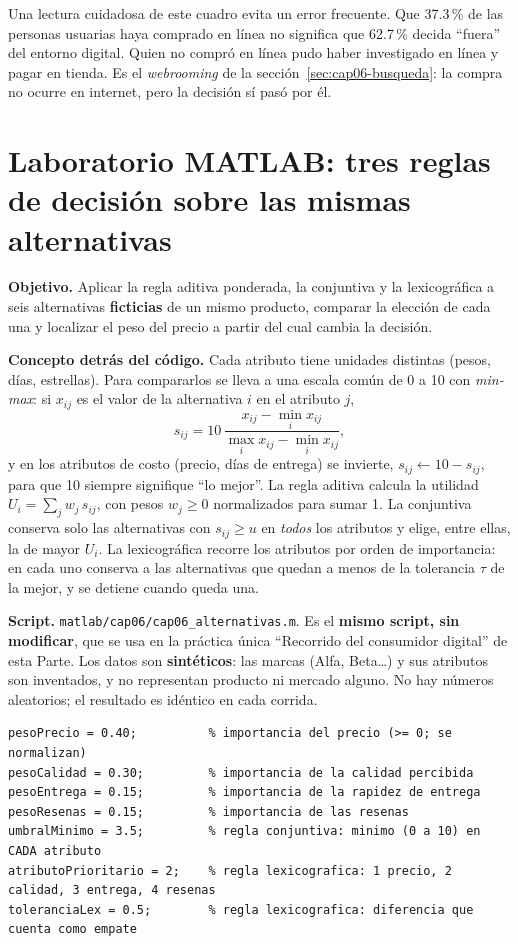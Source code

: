 Una lectura cuidadosa de este cuadro evita un error frecuente. Que 37.3\,\% de
las personas usuarias haya comprado en línea no significa que 62.7\,\% decida
\enquote{fuera} del entorno digital. Quien no compró en línea pudo haber
investigado en línea y pagar en tienda. Es el \textit{webrooming} de la
sección~\ref{sec:cap06-busqueda}: la compra no ocurre en internet, pero la decisión sí pasó por él.

\section{Laboratorio MATLAB: tres reglas de decisión sobre las mismas alternativas}
\label{sec:cap06-lab}

\begin{cajaLaboratorio}
\textbf{Objetivo.} Aplicar la regla aditiva ponderada, la conjuntiva y la
lexicográfica a seis alternativas \textbf{ficticias} de un mismo producto,
comparar la elección de cada una y localizar el peso del precio a partir del
cual cambia la decisión.

\textbf{Concepto detrás del código.} Cada atributo tiene unidades distintas
(pesos, días, estrellas). Para compararlos se lleva a una escala común de 0 a
10 con \emph{min-max}: si $x_{ij}$ es el valor de la alternativa $i$ en el
atributo $j$,
\[
  s_{ij} = 10\,\frac{x_{ij}-\min_i x_{ij}}{\max_i x_{ij}-\min_i x_{ij}},
\]
y en los atributos de costo (precio, días de entrega) se invierte, $s_{ij}
\leftarrow 10 - s_{ij}$, para que 10 siempre signifique \enquote{lo mejor}. La
regla aditiva calcula la utilidad $U_i=\sum_j w_j\,s_{ij}$, con pesos
$w_j\ge 0$ normalizados para sumar 1. La conjuntiva conserva solo las
alternativas con $s_{ij}\ge u$ en \emph{todos} los atributos y elige, entre
ellas, la de mayor $U_i$. La lexicográfica recorre los atributos por orden de
importancia: en cada uno conserva a las alternativas que quedan a menos de la
tolerancia $\tau$ de la mejor, y se detiene cuando queda una.

\textbf{Script.} \texttt{matlab/cap06/cap06\_alternativas.m}. Es el
\textbf{mismo script, sin modificar}, que se usa en la práctica única
\enquote{Recorrido del consumidor digital} de esta Parte. Los datos son
\textbf{sintéticos}: las marcas (Alfa, Beta\ldots) y sus atributos son
inventados, y no representan producto ni mercado alguno. No hay números
aleatorios; el resultado es idéntico en cada corrida.

\begin{lstlisting}[style=MATLABStyle, caption={Bloque de parámetros editable (\texttt{cap06\_alternativas.m}) — es lo único que cambia entre corridas.}]
pesoPrecio = 0.40;          % importancia del precio (>= 0; se normalizan)
pesoCalidad = 0.30;         % importancia de la calidad percibida
pesoEntrega = 0.15;         % importancia de la rapidez de entrega
pesoResenas = 0.15;         % importancia de las resenas
umbralMinimo = 3.5;         % regla conjuntiva: minimo (0 a 10) en CADA atributo
atributoPrioritario = 2;    % regla lexicografica: 1 precio, 2 calidad, 3 entrega, 4 resenas
toleranciaLex = 0.5;        % regla lexicografica: diferencia que cuenta como empate
\end{lstlisting}


\end{cajaLaboratorio}
